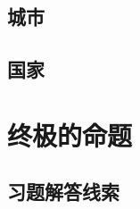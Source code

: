\documentclass[a4paper,10.5pt]{book}
\begin{document}
\section{城市}

\section{国家}



\chapter{终极的命题}



\begin{appendices}
\chapter{习题解答线索}



\end{appendices}
\end{document}
